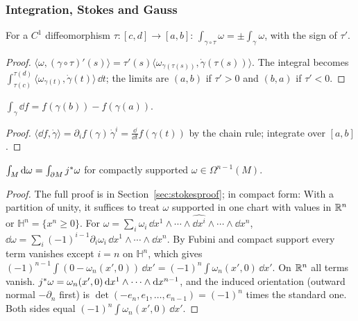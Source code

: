 \subsubsection*{Integration, Stokes and Gauss}

\begin{identity}\label{id:reparam}
For a $C^1$ diffeomorphism $\tau:[c,d]\to[a,b]$: $\int_{\gamma\circ\tau}\omega=\pm\int_\gamma\omega$, with the sign of $\tau'$.
\end{identity}
\begin{proof}
 $\langle\omega,(\gamma\circ\tau)'(s)\rangle=\tau'(s)\langle\omega_{\gamma(\tau(s))},\dot\gamma(\tau(s))\rangle$.
 The integral becomes $\int_{\tau(c)}^{\tau(d)}\langle\omega_{\gamma(t)},\dot\gamma(t)\rangle\,\dd t$; the limits are $(a,b)$ if $\tau'>0$ and $(b,a)$ if $\tau'<0$.
\end{proof}

\begin{identity}\label{id:ftc}
$\int_\gamma\dd f=f(\gamma(b))-f(\gamma(a))$.
\end{identity}
\begin{proof}
$\langle\dd f,\dot\gamma\rangle=\partial_if(\gamma)\,\dot\gamma^i=\frac{\dd}{\dd t}f(\gamma(t))$ by the chain rule; integrate over $[a,b]$.
\end{proof}

\begin{identity}\label{id:stokes}
$\int_M\mathrm{d}\omega=\int_{\partial M}j{}^{*}\omega$ for compactly supported $\omega\in\Omega^{n-1}(M)$.
\end{identity}
\begin{proof}
The full proof is in Section~\ref{sec:stokesproof}; in compact form:
 With a partition of unity, it suffices to treat $\omega$ supported in one chart with values in $\mathbb{R}^n$ or $\mathbb H^n=\{x^n\ge0\}$.
 For $\omega=\sum_i\omega_i\,\dd x^1\wedge\cdots\wedge\widehat{\dd x^i}\wedge\cdots\wedge\dd x^n$, $\dd\omega=\sum_i(-1)^{i-1}\partial_i\omega_i\,\dd x^1\wedge\cdots\wedge\dd x^n$.
 By Fubini and compact support every term vanishes except $i=n$ on $\mathbb H^n$, which gives $(-1)^{n-1}\int(0-\omega_n(x',0))\,\dd x'=(-1)^n\int\omega_n(x',0)\,\dd x'$. On $\mathbb{R}^n$ all terms vanish.
 $j{}^{*}\omega=\omega_n(x',0)\,\mathrm{d} x^1\wedge\cdots\wedge\mathrm{d} x^{n-1}$, and the induced orientation (outward normal $-\partial_n$ first) is $\det(-e_n,e_1,\dots,e_{n-1})=(-1)^n$ times the standard one. Both sides equal $(-1)^n\int\omega_n(x',0)\,\dd x'$.
\end{proof}

